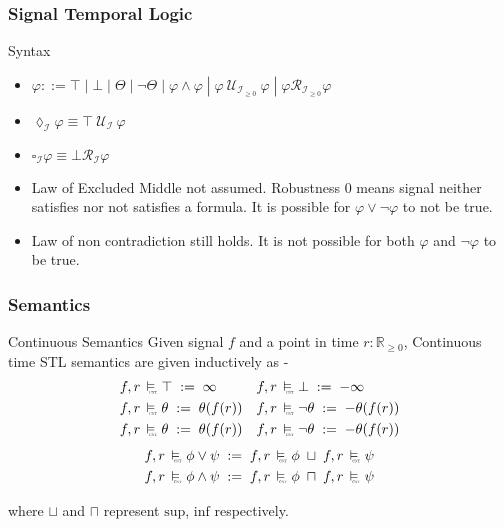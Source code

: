 \documentclass{beamer}
\newcommand{\always}[1]{\square_{#1}}
\newcommand{\eventually}[1]{\lozenge_{#1}}
\newcommand{\typeTime}{\mathbb{R}_{\geq 0}}
\newcommand{\until}{\mathcal{U}}
\newcommand{\release}{\mathcal{R}}
\newcommand{\interval}{\mathcal{I}}
\newcommand{\cont}{\raisebox{-0.1ex}{\scalebox{0.25}{\textrm{CNT}}}}
\newcommand{\contSatisfy}{\ \stackMath\stackunder[0pt]{\vDash}{\hspace*{0.3em}\cont}\ }
\newcommand{\robustAssign}{\; := \;}
\begin{document}
\begin{frame}
    \frametitle{Signal Temporal Logic}
    \begin{block}{Syntax}
        \begin{itemize}
            \item $ \varphi ::= \top \;|\; \bot \;|\; \Theta \;|\; \neg \Theta
                \; | \; \varphi \wedge \varphi \;|\; \varphi\ \until_{\interval_{\geq 0}}\ \varphi
                \; | \; \varphi \release_{\interval_{\geq 0}} \varphi $
            \item $\eventually{\interval} \varphi \equiv \top\ \until_{\interval}\ \varphi$
            \item $\always{\interval} \varphi \equiv \bot \release_{\interval} \varphi$
            \item Law of Excluded Middle not assumed. Robustness 0 means
                signal neither satisfies nor not satisfies a formula.
                It is possible for $\varphi \vee \neg \varphi$ to not
                be true.
            \item Law of non contradiction still holds. It is not possible
                for both $\varphi$ and $\neg \varphi$ to be true.
        \end{itemize}
    \end{block}
\end{frame}

\begin{frame}
    \frametitle{Semantics}
    \begin{block}{Continuous Semantics}
        Given signal $f$ and a point in time $r : \typeTime$,
        Continuous time STL semantics are given inductively as -
        \begin{align*}
              f, r &\contSatisfy \top       \robustAssign \infty &
              f, r &\contSatisfy \bot       \robustAssign -\infty \\
              f, r &\contSatisfy \theta     \robustAssign \theta(f(r)) &
              f, r &\contSatisfy \neg\theta \robustAssign -\theta(f(r)) \\
              f, r &\contSatisfy \theta     \robustAssign \theta(f(r)) &
              f, r &\contSatisfy \neg\theta \robustAssign -\theta(f(r)) \\
        \end{align*}
        \vspace{-1.6cm}
        \begin{align*}
            f, r \contSatisfy \phi \vee \psi  \robustAssign  f, r \contSatisfy \phi \; \sqcup \; f,r \contSatisfy \psi \\
            f, r \contSatisfy \phi \wedge \psi  \robustAssign  f, r \contSatisfy \phi \; \sqcap \; f,r \contSatisfy \psi \\
        \end{align*}
    \end{block}
    where $\sqcup$ and $\sqcap$ represent $\text{sup}$, $\text{inf}$ respectively.
\end{frame}
\end{document}
